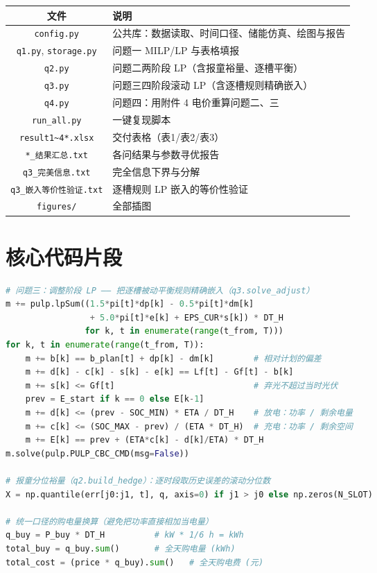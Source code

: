 \documentclass{cumcmthesis}
\begin{document}
\begin{center}
\begin{tabular}{cl}
\hline
文件 & 说明 \\
\hline
\texttt{config.py} & 公共库：数据读取、时间口径、储能仿真、绘图与报告 \\
\texttt{q1.py}, \texttt{storage.py} & 问题一 MILP/LP 与表格填报 \\
\texttt{q2.py} & 问题二两阶段 LP（含报童裕量、逐槽平衡） \\
\texttt{q3.py} & 问题三四阶段滚动 LP（含逐槽规则精确嵌入） \\
\texttt{q4.py} & 问题四：用附件 4 电价重算问题二、三 \\
\texttt{run\_all.py} & 一键复现脚本 \\
\texttt{result1\~{}4*.xlsx} & 交付表格（表1/表2/表3） \\
\texttt{*\_结果汇总.txt} & 各问结果与参数寻优报告 \\
\texttt{q3\_完美信息.txt} & 完全信息下界与分解 \\
\texttt{q3\_嵌入等价性验证.txt} & 逐槽规则 LP 嵌入的等价性验证 \\
\texttt{figures/} & 全部插图 \\
\hline
\end{tabular}
\end{center}

\section{核心代码片段}
\begin{lstlisting}[language=Python]
# 问题三：调整阶段 LP —— 把逐槽被动平衡规则精确嵌入（q3.solve_adjust）
m += pulp.lpSum((1.5*pi[t]*dp[k] - 0.5*pi[t]*dm[k]
                 + 5.0*pi[t]*e[k] + EPS_CUR*s[k]) * DT_H
                for k, t in enumerate(range(t_from, T)))
for k, t in enumerate(range(t_from, T)):
    m += b[k] == b_plan[t] + dp[k] - dm[k]        # 相对计划的偏差
    m += d[k] - c[k] - s[k] - e[k] == Lf[t] - Gf[t] - b[k]
    m += s[k] <= Gf[t]                            # 弃光不超过当时光伏
    prev = E_start if k == 0 else E[k-1]
    m += d[k] <= (prev - SOC_MIN) * ETA / DT_H    # 放电：功率 / 剩余电量
    m += c[k] <= (SOC_MAX - prev) / (ETA * DT_H)  # 充电：功率 / 剩余空间
    m += E[k] == prev + (ETA*c[k] - d[k]/ETA) * DT_H
m.solve(pulp.PULP_CBC_CMD(msg=False))

# 报童分位裕量（q2.build_hedge）：逐时段取历史误差的滚动分位数
X = np.quantile(err[j0:j1, t], q, axis=0) if j1 > j0 else np.zeros(N_SLOT)

# 统一口径的购电量换算（避免把功率直接相加当电量）
q_buy = P_buy * DT_H          # kW * 1/6 h = kWh
total_buy = q_buy.sum()       # 全天购电量 (kWh)
total_cost = (price * q_buy).sum()   # 全天购电费 (元)
\end{lstlisting}
\end{document}
